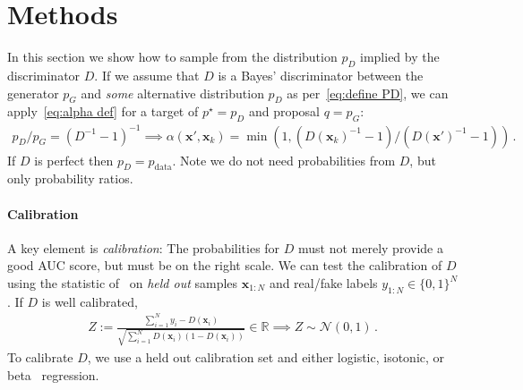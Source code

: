 \documentclass{article}
\renewcommand{\vec}[1]{{\boldsymbol{\mathbf{#1}}}} %
\newcommand{\R}{\mathbb{R}}
\newcommand{\sample}{\sim}
\newcommand{\norm}{\mathcal{N}}
\newcommand{\bern}{\textrm{Bern}}
\newcommand{\target}{{p^\star}}
\newcommand{\prop}{q}
\newcommand{\PG}{{p_G}}
\newcommand{\PD}{{p_D}}
\newcommand{\PR}{{p_{\textrm{data}}}}
\newcommand{\accept}{\alpha}
\begin{document}
\section{Methods}
\label{sec:Methods}

In this section we show how to sample from the distribution $\PD$ implied by the discriminator $D$.
If we assume that $D$ is a Bayes' discriminator between the generator $\PG$ and \emph{some} alternative distribution $\PD$ as per~\eqref{eq:define PD}, we can apply~\eqref{eq:alpha def} for a target of $\target=\PD$ and proposal $\prop=\PG$:
\begin{align}
  \PD/\PG = (D^{-1}-1)^{-1} \implies
  \accept(\vec x', \vec x_k) = \min\left(1, (D(\vec x_k)^{-1} - 1)/(D(\vec x')^{-1} - 1)\right)\,. \label{eq:alpha from D}
\end{align}
If $D$ is perfect then $\PD = \PR$.
Note we do not need probabilities from $D$, but only probability ratios.

\paragraph{Calibration}
A key element is \emph{calibration}: The probabilities for $D$ must not merely provide a good AUC score, but must be on the right scale.
We can test the calibration of $D$ using the statistic of~\citet{Dawid1997} on \emph{held out} samples $\vec x_{1:N}$ and real/fake labels $y_{1:N} \in \{0,1\}^N$.
If $D$ is well calibrated, %
\begin{align}
  Z := \frac{\sum_{i=1}^N y_i - D(\vec x_i)}{\sqrt{\sum_{i=1}^N D(\vec x_i) (1 - D(\vec x_i))}} \in \R \implies Z \sample \norm(0,1)\,. \label{eq:calib score}
\end{align}
To calibrate $D$, we use a held out calibration set and either logistic, isotonic, or beta~\citep{Kull2017} regression.
\end{document}
